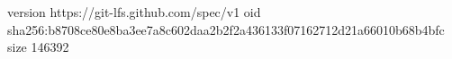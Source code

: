 version https://git-lfs.github.com/spec/v1
oid sha256:b8708ce80e8ba3ee7a8c602daa2b2f2a436133f07162712d21a66010b68b4bfc
size 146392
